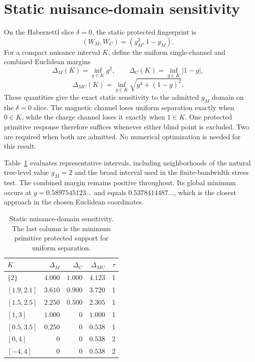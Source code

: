\documentclass[12pt]{iopjournal}
\newenvironment{ruledtabular}{\centering}{}
\newcommand{\colrule}{\hline}
\begin{document}
\section{Static nuisance-domain sensitivity}
\label{sec:supp-K-sensitivity}

On the Haberzettl slice $\delta=0$, the static protected fingerprint is
\begin{equation}
(W_M,W_C)=(g_M^2,1-g_M).
\end{equation}
For a compact nuisance interval $K$, define the uniform single-channel and combined Euclidean margins
\begin{equation}
\Delta_M(K)=\inf_{g\in K}g^2,
\qquad
\Delta_C(K)=\inf_{g\in K}|1-g|,
\end{equation}
\begin{equation}
\Delta_{MC}(K)=\inf_{g\in K}\sqrt{g^4+(1-g)^2}.
\end{equation}
These quantities give the exact static sensitivity to the admitted $g_M$ domain on the $\delta=0$ slice. The magnetic channel loses uniform separation exactly when $0\in K$, while the charge channel loses it exactly when $1\in K$. One protected primitive response therefore suffices whenever either blind point is excluded. Two are required when both are admitted. No numerical optimization is needed for this result.

Table~\ref{tab:K-sensitivity} evaluates representative intervals, including neighborhoods of the natural tree-level value $g_M=2$ and the broad interval used in the finite-bandwidth stress test. The combined margin remains positive throughout. Its global minimum occurs at $g=0.5897545123\ldots$ and equals $0.5378414487\ldots$, which is the closest approach in the chosen Euclidean coordinates.

\begin{table}[h]
\caption{Static nuisance-domain sensitivity. The last column is the minimum primitive protected support for uniform separation.}
\label{tab:K-sensitivity}
\begin{ruledtabular}
\begin{tabular}{lrrrr}
$K$ & $\Delta_M$ & $\Delta_C$ & $\Delta_{MC}$ & $\tau$\\
\colrule
$\{2\}$ & $4.000$ & $1.000$ & $4.123$ & 1\\
$[1.9,2.1]$ & $3.610$ & $0.900$ & $3.720$ & 1\\
$[1.5,2.5]$ & $2.250$ & $0.500$ & $2.305$ & 1\\
$[1,3]$ & $1.000$ & $0$ & $1.000$ & 1\\
$[0.5,3.5]$ & $0.250$ & $0$ & $0.538$ & 1\\
$[0,4]$ & $0$ & $0$ & $0.538$ & 2\\
$[-4,4]$ & $0$ & $0$ & $0.538$ & 2\\
\end{tabular}
\end{ruledtabular}
\end{table}
\end{document}
